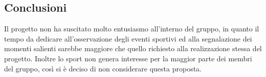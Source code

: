 \documentclass[../studio-di-fattibilita.tex]{subfiles}
\begin{document}
\subsection{Conclusioni}%
\label{subsec:conclusioni}
Il progetto non ha suscitato molto entusiasmo all'interno del gruppo, in quanto il tempo da dedicare all'osservazione degli eventi sportivi ed alla segnalazione dei momenti salienti sarebbe maggiore che quello richiesto alla realizzazione stessa del progetto. Inoltre lo sport non genera interesse per la maggior parte dei membri del gruppo, così si è deciso di non considerare questa proposta.
\end{document}
